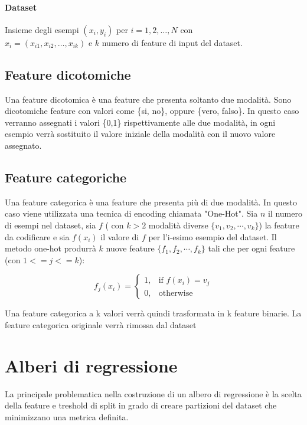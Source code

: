 \documentclass{article}
\begin{document}
    \paragraph{Dataset}

    Insieme degli esempi $(x_i, y_i)$ per $ i=1,2,\ldots,N$ con \\
    $ x_i = (x_{i1},x_{i2},\ldots,x_{ik})$
    e $k$ numero di feature di input del dataset.

    \subsection{Feature dicotomiche}
    Una feature dicotomica è una feature che presenta soltanto due modalità. Sono dicotomiche
    feature con valori come \{si, no\}, oppure \{vero, falso\}. In questo caso verranno 
    assegnati i valori \{0,1\} rispettivamente alle due modalità, in ogni esempio verrà sostituito
    il valore iniziale della modalità con il nuovo valore assegnato.

    \subsection{Feature categoriche}
    Una feature categorica è una feature che presenta più di due modalità. In questo caso 
    viene utilizzata una tecnica di encoding chiamata "One-Hot". 
    Sia \(n\) il numero di esempi nel dataset, sia \(f\) ( con \(k > 2\) modalità
    diverse $\{v_1, v_2, \cdots ,v_k\}$) la feature da codificare e sia $f(x_i)$ il valore di $f$ 
    per l'i-esimo esempio del dataset.
    Il metodo one-hot produrrà \(k\) nuove feature
    $\{f_1, f_2, \cdots ,f_k\}$
    tali che per ogni feature (con $ 1 <= j <= k$):
    
    \[
        f_j(x_i)=
        \begin{cases}
            1, & \text{if } f(x_i)=v_j \\
            0, & \text{otherwise}
        \end{cases}
    \]

    Una feature categorica a k valori verrà quindi trasformata in k feature binarie.
    La feature categorica originale verrà rimossa dal dataset
    

    \section{Alberi di regressione}
    La principale problematica
    nella costruzione di un albero di regressione è la scelta della feature e treshold 
    di split in grado di creare partizioni del dataset che 
    minimizzano una metrica definita.
\end{document}

